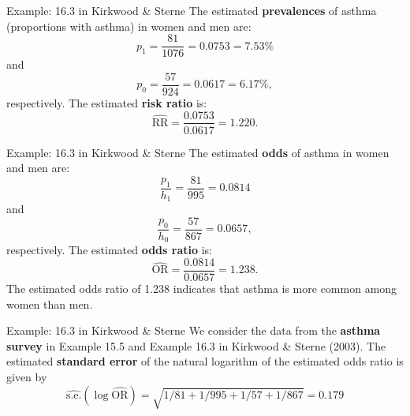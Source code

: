 \documentclass[compress, notes=hide]{beamer}
\newcommand{\hl}[1]{\textbf{#1}}
\begin{document}
\begin{frame}
\begin{block}{Example: 16.3 in Kirkwood \& Sterne}
  The estimated \hl{prevalences} of asthma (proportions with
  asthma) in women and men are:
\begin{equation*}
p_1 = \frac{81}{1076} = 0.0753 = 7.53\%
\end{equation*}
and
\begin{equation*}
p_0 = \frac{57}{924} = 0.0617 = 6.17\%,
\end{equation*}
respectively. The estimated \hl{risk ratio} is:
\begin{equation*}
\widehat{\mathrm{RR}} = \frac{0.0753}{0.0617} = 1.220.
\end{equation*}
\end{block}
\end{frame}

\begin{frame}
\begin{block}{Example: 16.3 in Kirkwood \& Sterne}
The estimated \hl{odds} of asthma in women and men are:
\begin{equation*}
\frac{p_1}{h_1} = \frac{81}{995} = 0.0814
\end{equation*}
and
\begin{equation*}
\frac{p_0}{h_0} = \frac{57}{867} = 0.0657,
\end{equation*}
respectively. The estimated \hl{odds ratio} is:
\begin{equation*}
\widehat{\mathrm{OR}} = \frac{0.0814}{0.0657} = 1.238.
\end{equation*}
The estimated odds ratio of 1.238 indicates that asthma is more common
among women than men.
\end{block}
\end{frame}

\begin{frame}
\begin{block}{Example: 16.3 in Kirkwood \& Sterne}
  We consider the data from the \hl{asthma survey} in Example 15.5
  and Example 16.3 in Kirkwood \& Sterne (2003). The estimated
  \hl{standard error} of the natural logarithm of the estimated
  odds ratio is given by
\begin{equation*}
\widehat{\mathrm{s.e.}}(\log \widehat{\mathrm{OR}}) = \sqrt{1/81 + 1/995 + 1/57 + 1/867} = 0.179
\end{equation*}
\end{block}
\end{frame}
\end{document}
